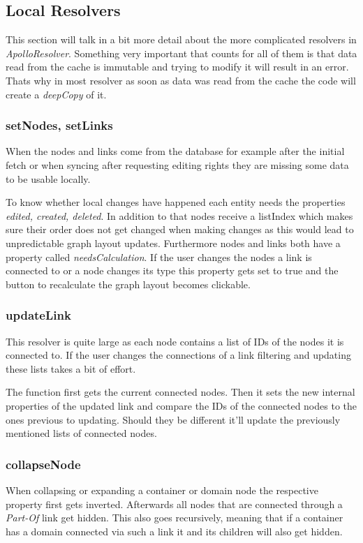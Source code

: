 \subsection{Local Resolvers}
This section will talk in a bit more detail about the more complicated resolvers in \emph{ApolloResolver}. Something very important that counts for all of them is that data read from the cache is immutable and trying to modify it will result in an error. Thats why in most resolver as soon as data was read from the cache the code will create a \emph{deepCopy} of it.

\subsubsection{setNodes, setLinks}
When the nodes and links come from the database for example after the initial fetch or when syncing after requesting editing rights they are missing some data to be usable locally.

To know whether local changes have happened each entity needs the properties \emph{edited, created, deleted}. In addition to that nodes receive a listIndex which makes sure their order does not get changed when making changes as this would lead to unpredictable graph layout updates. Furthermore nodes and links both have a property called \emph{needsCalculation}. If the user changes the nodes a link is connected to or a node changes its type this property gets set to true and the button to recalculate the graph layout becomes clickable.

\subsubsection{updateLink}
This resolver is quite large as each node contains a list of IDs of the nodes it is connected to. If the user changes the connections of a link filtering and updating these lists takes a bit of effort.

The function first gets the current connected nodes. Then it sets the new internal properties of the updated link and compare the IDs of the connected nodes to the ones previous to updating. Should they be different it'll update the previously mentioned lists of connected nodes.

\subsubsection{collapseNode}
When collapsing or expanding a container or domain node the respective property first gets inverted. Afterwards all nodes that are connected through a \emph{Part-Of} link get hidden. This also goes recursively, meaning that if a container has a domain connected via such a link it and its children will also get hidden.

